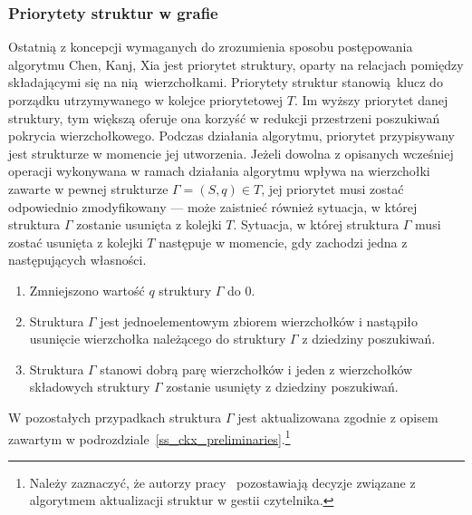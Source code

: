 \subsubsection{Priorytety struktur w grafie}
\label{sss_ckx_priorities}
\par{
  Ostatnią z koncepcji wymaganych do zrozumienia sposobu postępowania algorytmu Chen, Kanj, Xia jest priorytet struktury, oparty na relacjach pomiędzy składającymi się na nią wierzchołkami.
  Priorytety struktur stanowią klucz do porządku utrzymywanego w kolejce priorytetowej $T$.
  Im wyższy priorytet danej struktury, tym większą oferuje ona korzyść w redukcji przestrzeni poszukiwań pokrycia wierzchołkowego.
  Podczas działania algorytmu, priorytet przypisywany jest strukturze w momencie jej utworzenia.
  Jeżeli dowolna z opisanych wcześniej operacji wykonywana w ramach działania algorytmu wpływa na wierzchołki zawarte w pewnej strukturze $\Gamma=(S, q) \in T$, jej priorytet musi zostać odpowiednio zmodyfikowany --- może zaistnieć również sytuacja, w której struktura $\Gamma$ zostanie usunięta z kolejki $T$.
  Sytuacja, w której struktura $\Gamma$ musi zostać usunięta z kolejki $T$ następuje w momencie, gdy zachodzi jedna z następujących własności.
  \begin{enumerate}
    \item Zmniejszono wartość $q$ struktury $\Gamma$ do $0$.
    \item Struktura $\Gamma$ jest jednoelementowym zbiorem wierzchołków i nastąpiło usunięcie wierzchołka należącego do struktury $\Gamma$ z dziedziny poszukiwań.
    \item Struktura $\Gamma$ stanowi dobrą parę wierzchołków i jeden z wierzchołków składowych struktury $\Gamma$ zostanie usunięty z dziedziny poszukiwań.
  \end{enumerate}
  
  W pozostałych przypadkach struktura $\Gamma$ jest aktualizowana zgodnie z opisem zawartym w podrozdziale~\ref{ss_ckx_preliminaries}.\footnote{Należy zaznaczyć, że autorzy pracy~\cite{ImprovedBounds10} pozostawiają decyzje związane z algorytmem aktualizacji struktur w gestii czytelnika.}

}
